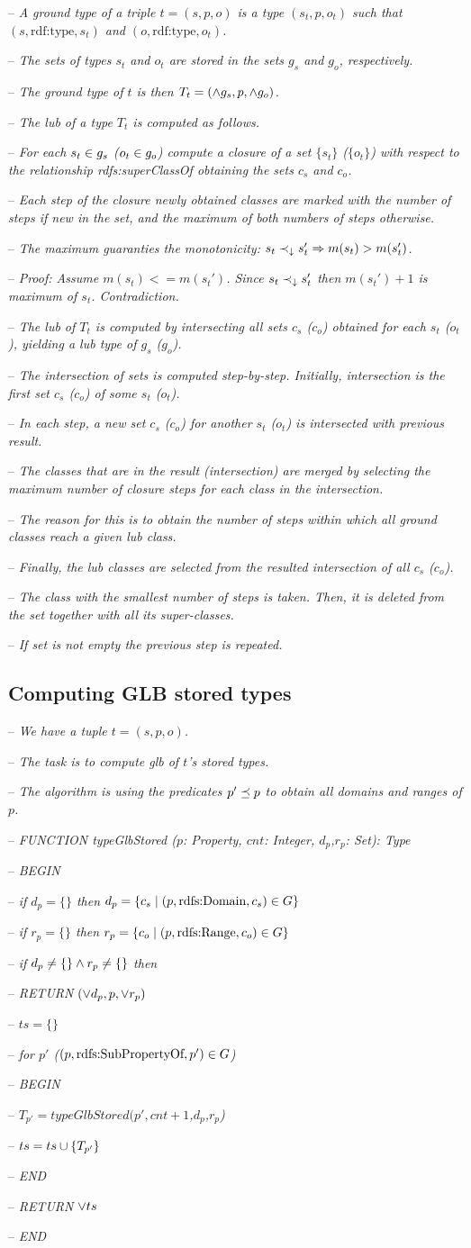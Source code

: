 \documentclass[runningheads]{llncs}
\newcommand{\darr}{\downarrow}
\newcommand{\notes}[1]{\noindent\begin{small}-- \emph{#1}\\\end{small}}
\begin{document}
\notes{A ground type of a triple $t=(s,p,o)$ is a type $(s_t,p,o_t)$ such that $(s,\text{rdf:type},s_t)$ and $(o,\text{rdf:type},o_t)$.}
\notes{The sets of types $s_t$ and $o_t$ are stored in the sets $g_s$ and $g_o$, respectively.}
\notes{The ground type of $t$ is then $T_t=(\land\/g_s,p,\land\/g_o)$.}
\notes{The lub of a type $T_t$ is computed as follows.}

\notes{For each $s_t\in\/g_s$ ($o_t\in\/g_o$) compute a closure of a set $\{s_t\}$ ($\{o_t\}$) with respect to the relationship rdfs:superClassOf obtaining the sets $c_s$ and $c_o$.}
\notes{Each step of the closure newly obtained classes are marked with the number of steps if new in the set, and the maximum of both numbers of steps otherwise.}
\notes{The maximum guaranties the monotonicity: $s_t\prec_\darr\/s_t'\Rightarrow\/m(s_t)>m(s_t')$.}
\notes{Proof: Assume $m(s_t)<=m(s_t')$. Since $s_t\prec_\darr\/s_t'$ then $m(s_t')+1$ is maximum of $s_t$. Contradiction.}

\notes{The lub of $T_t$ is computed by intersecting all sets $c_s$ ($c_o$) obtained for each $s_t$ ($o_t$), yielding a lub type of $g_s$ ($g_o$).}
\notes{The intersection of sets is computed step-by-step. Initially, intersection is the first set $c_s$ ($c_o$) of some $s_t$ ($o_t$).}
\notes{In each step, a new set $c_s$ ($c_o$) for another $s_t$ ($o_t$) is intersected with previous result.}
\notes{The classes that are in the result (intersection) are merged by selecting the maximum number of closure steps for each class in the intersection.}
\notes{The reason for this is to obtain the number of steps within which all ground classes reach a given lub class.}

\notes{Finally, the lub classes are selected from the resulted intersection of all $c_s$ ($c_o$).}
\notes{The class with the smallest number of steps is taken. Then, it is deleted from the set together with all its super-classes.}
\notes{If set is not empty the previous step is repeated.}

\subsection{Computing GLB stored types}


\notes{We have a tuple $t=(s,p,o)$.}
\notes{The task is to compute glb of $t$'s stored types.}
\notes{The algorithm is using the predicates $p'\preceq\/p$ to obtain all domains and ranges of $p$.}



\notes{FUNCTION typeGlbStored ($p$: Property, $cnt$: Integer, $d_p$,$r_p$: Set): Type}
\notes{BEGIN}
\notes{if $d_p=\{\}$ then $d_p =  \{ c_s \mid (p,\text{rdfs:Domain},c_s)\in\/G\}$}
\notes{if $r_p=\{\}$ then $r_p =  \{ c_o \mid (p,\text{rdfs:Range},c_o)\in\/G\}$}
\notes{if $d_p\not=\{\}\land\/r_p\not=\{\}$ then }
\notes{RETURN $(\lor\/d_p,p,\lor\/r_p)$}
\notes{$ts = \{\}$}
\notes{for $p'$ ($(p,\text{rdfs:SubPropertyOf},p')\in\/G$)}
\notes{BEGIN}
\notes{$T_{p'} = typeGlbStored(p',cnt+1$,$d_p$,$r_p$)}
\notes{$ts = ts\cup\/\{T_{p'}\}$}
\notes{END}
\notes{RETURN $\lor\/ts$}
\notes{END}
\end{document}
